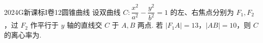 
\begin{problem}{2024}{G}{新课标I卷}{12}{圆锥曲线}
设双曲线 $C:\dfrac{x^2}{a^2}-\dfrac{y^2}{b^2}=1$ 的左、右焦点分别为 $F_1, F_2$，过 $F_2$ 作平行于 $y$ 轴的直线交 $C$ 于 $A,B$ 两点. 若 $|F_1A|=13$，$|AB|=10$，则 $C$ 的离心率为\underline{\hspace{4em}}.
\end{problem}